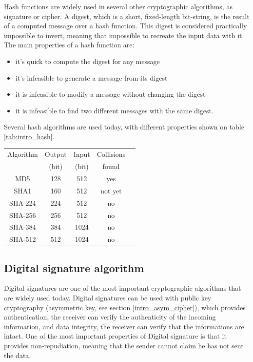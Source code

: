 Hash functions are widely used in several other cryptographic
algorithms, as signature or cipher.
A digest, which is a short, fixed-length bit-string, is the result of a computed
message over a hash function.
This digest is considered practically impossible to invert, meaning
that impossible to recreate the input data with it.
The main properties of a hash function are:
\begin{itemize}[noitemsep]
  \item it's quick to compute the digest for any message
  \item it's infeasible to generate a message from its digest
  \item it is infeasible to modify a message without changing the digest
  \item it is infeasible to find two different messages with the same
  digest.\newline
\end{itemize}

Several hash algorithms are used today, with different properties shown on table
\ref{tab:intro_hash}. 

\begin{center}

\begin{tabular}{| c | *{4}{c|}}
 \hline
 Algorithm 	& Output & Input & Collisions \\
           	& (bit)  & (bit) & found		 \\
 \hline
 MD5 	   	& 128	& 512	& yes \cite{RFC7465} \\
 SHA1	   	& 160	& 512	& not yet \\
 \hline
SHA-224		& 224	& 512	& no \\
SHA-256		& 256	& 512	& no \\
SHA-384		& 384	& 1024	& no \\
SHA-512		& 512	& 1024	& no \\
\hline
 
\end{tabular}
\label{tab:intro_hash}

\end{center}

\subsection{Digital signature algorithm}
\label{intro_sign}

Digital signatures are one of the most important cryptographic algorithms that
are widely used today. Digital signatures can be used with public key
cryptography (asymmetric key, see section \ref{intro_asym_cipher}), which
provides authentication, the receiver can verify the authenticity of the
incoming information, and data integrity, the receiver can verify that the
informations are intact.
One of the most important properties of Digital signature is that it provides
non-repudiation, meaning that the sender cannot claim he has not sent the
data.

